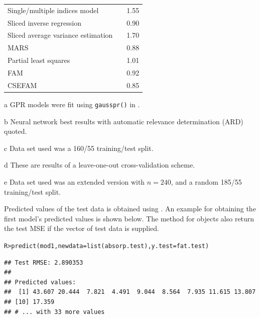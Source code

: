 \documentclass[showframe,11pt]{report}\usepackage[]{graphicx}\usepackage[]{color}
\makeatletter
\newcommand{\hlstd}[1]{\textcolor[rgb]{0.196,0.196,0.196}{#1}}%
\newcommand{\hlkwc}[1]{\textcolor[rgb]{0,0.631,0.314}{#1}}%
\newcommand{\hlkwd}[1]{\textcolor[rgb]{0.78,0.227,0.412}{#1}}%
\newenvironment{kframe}{%
 \def\at@end@of@kframe{}%
 \ifinner\ifhmode%
  \def\at@end@of@kframe{\end{minipage}}%
  \begin{minipage}{\columnwidth}%
 \fi\fi%
 \def\FrameCommand##1{\hskip\@totalleftmargin \hskip-\fboxsep
 \colorbox{shadecolor}{##1}\hskip-\fboxsep
     \hskip-\linewidth \hskip-\@totalleftmargin \hskip\columnwidth}%
 \MakeFramed {\advance\hsize-\width
   \@totalleftmargin\z@ \linewidth\hsize
   \@setminipage}}%
 {\par\unskip\endMakeFramed%
 \at@end@of@kframe}
\newenvironment{knitrout}{}{} %
\makeatother
\begin{document}
\begin{table}[p]
\begin{threeparttable}
\begin{tabular}{p{7cm}rr}
\hspace{0.5em} Single/multiple indices model\tnote{d}      && 1.55
\\[0.5em]
\hspace{0.5em} Sliced inverse regression                   && 0.90 \\
\hspace{0.5em} Sliced average variance estimation          && 1.70 \\
\hspace{0.5em} MARS\tnote{e}                               && 0.88
\\[0.5em]
\hspace{0.5em} Partial least squares\tnote{e}              && 1.01 \\
\hspace{0.5em} FAM\tnote{e}                                && 0.92 \\
\hspace{0.5em} CSEFAM\tnote{e}                             && 0.85 \\
\bottomrule
\end{tabular}
\begin{tablenotes}\footnotesize
\item [a] GPR models were fit using \texttt{gausspr()} in .
\item [b] Neural network best results with automatic relevance determination (ARD) quoted.
\item [c] Data set used was a 160/55 training/test split.
\item [d] These are results of a leave-one-out cross-validation scheme.
\item [e] Data set used was an extended version with $n=240$, and a random 185/55 training/test split.
\end{tablenotes}
\end{threeparttable}
\end{table}

Predicted values of the test data is obtained using .
An example for obtaining the first model's predicted values is shown below.
The  method for  objects also return the test MSE if the vector of test data is supplied.

\begin{knitrout}
\color{fgcolor}\begin{kframe}
\begin{alltt}
\hlstd{R> }\hlkwd{predict}\hlstd{(mod1,} \hlkwc{newdata} \hlstd{=} \hlkwd{list}\hlstd{(absorp.test),} \hlkwc{y.test} \hlstd{= fat.test)}
\end{alltt}
\begin{verbatim}
## Test RMSE: 2.890353 
## 
## Predicted values:
##  [1] 43.607 20.444  7.821  4.491  9.044  8.564  7.935 11.615 13.807
## [10] 17.359
## # ... with 33 more values
\end{verbatim}
\end{kframe}
\end{knitrout}
\end{document}
